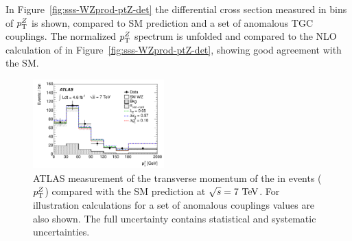 \begin{table}[htp]
\begin{center}
\caption{Summary of measured fiducial and total $\WZ$ production cross sections from ATLAS 
at 7 TeV centre-of-mass energies in the $\ll\lnu$ final state.}
\end{center}
\label{tab:sss-WZprod-xsec}
\end{table}%


In Figure~\ref{fig:sss-WZprod-ptZ-det} the differential cross section measured in bins of 
$p_{\mathrm{T}}^Z$ is shown, compared to SM prediction and a set of anomalous TGC couplings. 
The normalized $p_{\mathrm{T}}^Z$ spectrum is unfolded and compared to the NLO calculation of \mcatnlo in 
Figure~\ref{fig:sss-WZprod-ptZ-det}, showing good agreement with the SM.


\begin{figure}[htbp]
  \begin{center}
  \includegraphics[width=0.45\textwidth]{figures/sss-inclboson-diboson-wzprod-ptZ-det.pdf}
  \caption{ATLAS measurement of the transverse momentum of the \Zboson in \WZ events ($p_{\mathrm{T}}^Z$) compared with the SM prediction at $\rts = 7\TeV$. For illustration calculations for a set of anomalous couplings values are also shown. The full uncertainty contains statistical and systematic uncertainties.}
\label{fig:sss-WZprod-ptZ}
\end{center}
\end{figure}

